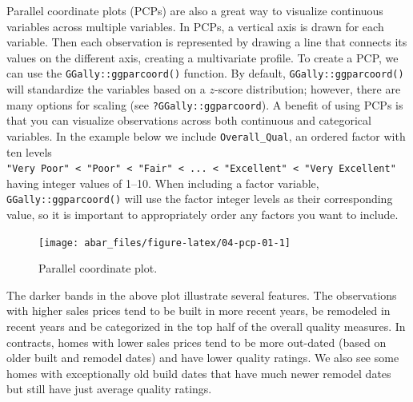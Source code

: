 \documentclass[]{book}
\newenvironment{Shaded}{\begin{snugshade}}{\end{snugshade}}
\newcommand{\CommentTok}[1]{\textcolor[rgb]{0.56,0.35,0.01}{\textit{#1}}}
\newcommand{\DataTypeTok}[1]{\textcolor[rgb]{0.13,0.29,0.53}{#1}}
\newcommand{\FloatTok}[1]{\textcolor[rgb]{0.00,0.00,0.81}{#1}}
\newcommand{\KeywordTok}[1]{\textcolor[rgb]{0.13,0.29,0.53}{\textbf{#1}}}
\newcommand{\NormalTok}[1]{#1}
\newcommand{\OperatorTok}[1]{\textcolor[rgb]{0.81,0.36,0.00}{\textbf{#1}}}
\newcommand{\StringTok}[1]{\textcolor[rgb]{0.31,0.60,0.02}{#1}}
\theoremstyle{definition}
\theoremstyle{definition}
\theoremstyle{definition}
\theoremstyle{remark}
\begin{document}
Parallel coordinate plots (PCPs) are also a great way to visualize
continuous variables across multiple variables. In PCPs, a vertical axis
is drawn for each variable. Then each observation is represented by
drawing a line that connects its values on the different axis, creating
a multivariate profile. To create a PCP, we can use the
\texttt{GGally::ggparcoord()} function. By default,
\texttt{GGally::ggparcoord()} will standardize the variables based on a
\(z\)-score distribution; however, there are many options for scaling
(see \texttt{?GGally::ggparcoord}). A benefit of using PCPs is that you
can visualize observations across both continuous and categorical
variables. In the example below we include \texttt{Overall\_Qual}, an
ordered factor with ten levels
\texttt{"Very\ Poor"\ \textless{}\ "Poor"\ \textless{}\ "Fair"\ \textless{}\ ...\ \textless{}\ "Excellent"\ \textless{}\ "Very\ Excellent"}
having integer values of 1--10. When including a factor variable,
\texttt{GGally::ggparcoord()} will use the factor integer levels as
their corresponding value, so it is important to appropriately order any
factors you want to include.

\begin{Shaded}
\end{Shaded}

\begin{figure}

{\centering \texttt{[image: abar\_files/figure-latex/04-pcp-01-1]} 

}

\caption{Parallel coordinate plot.}\label{fig:04-pcp-01}
\end{figure}

The darker bands in the above plot illustrate several features. The
observations with higher sales prices tend to be built in more recent
years, be remodeled in recent years and be categorized in the top half
of the overall quality measures. In contracts, homes with lower sales
prices tend to be more out-dated (based on older built and remodel
dates) and have lower quality ratings. We also see some homes with
exceptionally old build dates that have much newer remodel dates but
still have just average quality ratings.
\end{document}
